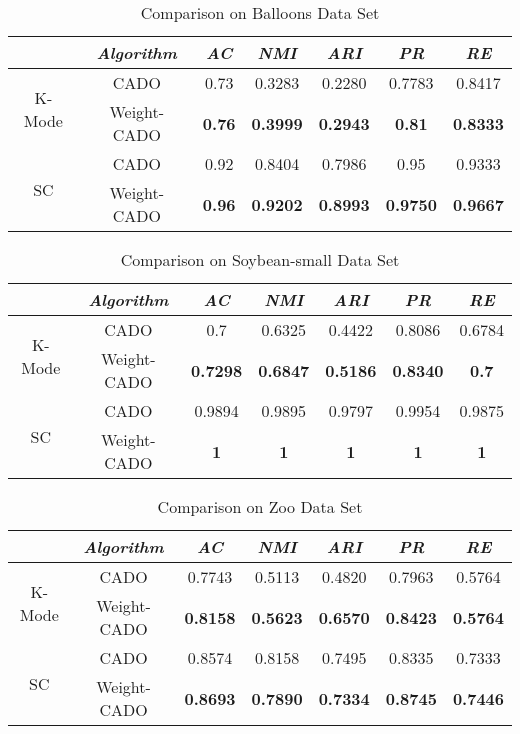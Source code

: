 \documentclass[review]{elsarticle}
\begin{document}
\begin{table}[!h]\tabcolsep=0.065in
\centering
\caption{Comparison on Balloons Data Set}
\small
\label{tab:Comparison on Balloons Data Set}
\begin{tabular}{c|c|c|c|c|c|c}
\hline
\emph{}&\emph{Algorithm}&\emph{AC}&\emph{NMI}&\emph{ARI}&\emph{PR}&\emph{RE} \\
\hline
\multirow{2}{*}{K-Mode} & CADO & 0.73 & 0.3283 & 0.2280 & 0.7783 & 0.8417\\
    \cline{2-7}
    & Weight-CADO & \textbf{0.76} & \textbf{0.3999} & \textbf{0.2943} & \textbf{0.81} & \textbf{0.8333}\\
    \hline
\multirow{2}{*}{SC} & CADO & 0.92 & 0.8404 & 0.7986 & 0.95 & 0.9333\\
    \cline{2-7}
    & Weight-CADO & \textbf{0.96} & \textbf{0.9202} & \textbf{0.8993} & \textbf{0.9750} & \textbf{0.9667}\\
\hline
\end{tabular}
\end{table}

\begin{table}[!h]\tabcolsep=0.065in
\centering
\caption{Comparison on Soybean-small Data Set}
\small
\label{tab:Comparison on Soybean-small Data Set}
\begin{tabular}{c|c|c|c|c|c|c}
\hline
\emph{}&\emph{Algorithm}&\emph{AC}&\emph{NMI}&\emph{ARI}&\emph{PR}&\emph{RE} \\
\hline
\multirow{2}{*}{K-Mode} & CADO & 0.7  & 0.6325  & 0.4422  & 0.8086  & 0.6784 \\
    \cline{2-7}
    & Weight-CADO & \textbf{0.7298} & \textbf{0.6847} & \textbf{0.5186} & \textbf{0.8340} & \textbf{0.7}\\
    \hline
\multirow{2}{*}{SC} & CADO & 0.9894 & 0.9895 & 0.9797 & 0.9954 & 0.9875\\
    \cline{2-7}
    & Weight-CADO & \textbf{1} & \textbf{1} & \textbf{1} & \textbf{1} & \textbf{1}\\
\hline
\end{tabular}
\end{table}

\begin{table}[!h]\tabcolsep=0.065in
\centering
\caption{Comparison on Zoo Data Set}
\small
\label{tab:Comparison on Zoo Data Set}
\begin{tabular}{c|c|c|c|c|c|c}
\hline
\emph{}&\emph{Algorithm}&\emph{AC}&\emph{NMI}&\emph{ARI}&\emph{PR}&\emph{RE} \\
\hline
\multirow{2}{*}{K-Mode} & CADO & 0.7743 & 0.5113 & 0.4820 & 0.7963 & 0.5764\\
    \cline{2-7}
    & Weight-CADO & \textbf{0.8158} & \textbf{0.5623} & \textbf{0.6570} & \textbf{0.8423} & \textbf{0.5764}\\
    \hline
\multirow{2}{*}{SC} & CADO & 0.8574 & 0.8158 & 0.7495 & 0.8335 & 0.7333\\
    \cline{2-7}
    & Weight-CADO & \textbf{0.8693} & \textbf{0.7890} & \textbf{0.7334} & \textbf{0.8745} & \textbf{0.7446}\\
\hline
\end{tabular}
\end{table}
\end{document}
